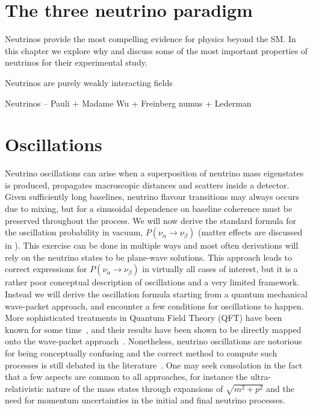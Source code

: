 \graphicspath{{}{theory/}{Diagrams/}}


\section{The three neutrino paradigm}

Neutrinos provide the most compelling evidence for physics beyond the SM. In this chapter we explore why and discuss some of the most important properties of neutrinos for their experimental study.

Neutrinos are purely weakly interacting fields

Neutrinos -- Pauli + Madame Wu + Freinberg numus + Lederman

\section{Oscillations}

Neutrino oscillations can arise when a superposition of neutrino mass eigenstates is produced, propagates macroscopic distances and scatters inside a detector. Given sufficiently long baselines, neutrino flavour transitions may always occurs due to mixing, but for a sinusoidal dependence on baseline coherence must be preserved throughout the process. We will now derive the standard formula for the oscillation probability in vacuum, $P(\nu_\alpha \to \nu_\beta)$ (matter effects are discussed in ). This exercise can be done in multiple ways and most often derivations will rely on the neutrino states to be plane-wave solutions. This approach leads to correct expressions for $P(\nu_\alpha \to \nu_\beta)$ in virtually all cases of interest, but it is a rather poor conceptual description of oscillations and a very limited framework. Instead we will derive the oscillation formula starting from a quantum mechanical wave-packet approach, and encounter a few conditions for oscillations to happen. More sophisticated treatments in Quantum Field Theory (QFT) have been known for some time~\cite{Cardall:1999ze,Beuthe:2001rc,Giunti:2002xg}, and their results have been shown to be directly mapped onto the wave-packet approach~\cite{Akhmedov:2010ms}. Nonetheless, neutrino oscillations are notorious for being conceptually confusing and the correct method to compute such processes is still debated in the literature~\cite{Kobach:2017osm}. One may seek consolation in the fact that a few aspects are common to all approaches, for instance the ultra-relativistic nature of the mass states through expansions of $\sqrt{m^2 + p^2}$ and the need for momentum uncertainties in the initial and final neutrino processes.

